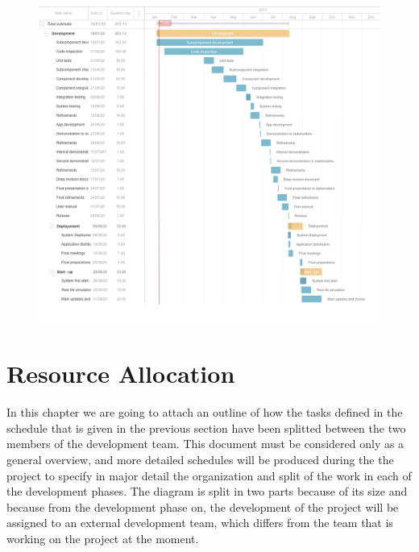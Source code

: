 \documentclass[a4paper,10pt]{article}
\begin{document}
  \begin{figure}[!h]
  \centering
    \includegraphics[scale=0.50]{Resources/gant2.png}
  \end{figure}\FloatBarrier
  \clearpage\section{Resource Allocation}
  In this chapter we are going to attach an outline of how the tasks defined in the schedule that is given in the previous section 
  have been splitted between the two members of the development team.  This document must be considered only as a general
  overview, and more detailed schedules will be produced during the the project to specify in major detail the organization 
  and split of the work in each of the development phases. The diagram is split in two parts because of its size and because 
  from the development phase on, the development of the project will be assigned to an external development team, which differs
  from the team that is working on the project at the moment.
\end{document}
